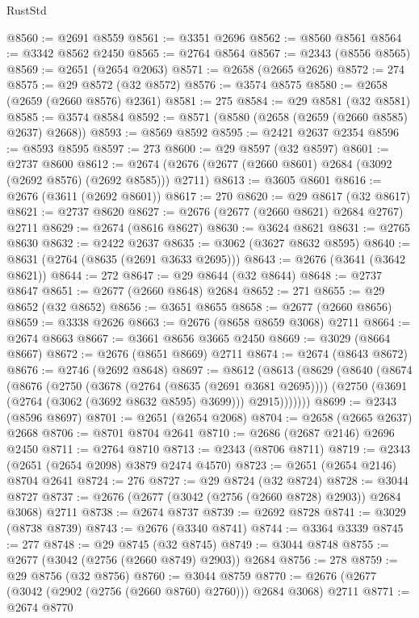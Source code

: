\begin{lexlean}{RustStd}
\begin{coremodule}
@8560 := @2691 @8559
@8561 := @3351 @2696
@8562 := @8560 @8561
@8564 := @3342 @8562 @2450
@8565 := @2764 @8564
@8567 := @2343 (@8556 @8565)
@8569 := @2651 (@2654 @2063)
@8571 := @2658 (@2665 @2626)
@8572 := 274
@8575 := @29 @8572 (@32 @8572)
@8576 := @3574 @8575
@8580 := @2658 (@2659 (@2660 @8576) @2361)
@8581 := 275
@8584 := @29 @8581 (@32 @8581)
@8585 := @3574 @8584
@8592 := @8571 (@8580 (@2658 (@2659 (@2660 @8585) @2637) @2668))
@8593 := @8569 @8592
@8595 := @2421 @2637 @2354
@8596 := @8593 @8595
@8597 := 273
@8600 := @29 @8597 (@32 @8597)
@8601 := @2737 @8600
@8612 := @2674 (@2676 (@2677 (@2660 @8601) @2684 (@3092 (@2692 @8576) (@2692 @8585))) @2711)
@8613 := @3605 @8601
@8616 := @2676 (@3611 (@2692 @8601))
@8617 := 270
@8620 := @29 @8617 (@32 @8617)
@8621 := @2737 @8620
@8627 := @2676 (@2677 (@2660 @8621) @2684 @2767) @2711
@8629 := @2674 (@8616 @8627)
@8630 := @3624 @8621
@8631 := @2765 @8630
@8632 := @2422 @2637
@8635 := @3062 (@3627 @8632 @8595)
@8640 := @8631 (@2764 (@8635 (@2691 @3633 @2695)))
@8643 := @2676 (@3641 (@3642 @8621))
@8644 := 272
@8647 := @29 @8644 (@32 @8644)
@8648 := @2737 @8647
@8651 := @2677 (@2660 @8648) @2684
@8652 := 271
@8655 := @29 @8652 (@32 @8652)
@8656 := @3651 @8655
@8658 := @2677 (@2660 @8656)
@8659 := @3338 @2626
@8663 := @2676 (@8658 @8659 @3068) @2711
@8664 := @2674 @8663
@8667 := @3661 @8656 @3665 @2450
@8669 := @3029 (@8664 @8667)
@8672 := @2676 (@8651 @8669) @2711
@8674 := @2674 (@8643 @8672)
@8676 := @2746 (@2692 @8648)
@8697 := @8612
    (@8613
      (@8629
        (@8640
          (@8674
            (@8676
              (@2750
                (@3678 (@2764 (@8635 (@2691 @3681 @2695))))
                (@2750 (@3691 (@2764 (@3062 (@3692 @8632 @8595) @3699))) @2915)))))))
@8699 := @2343 (@8596 @8697)
@8701 := @2651 (@2654 @2068)
@8704 := @2658 (@2665 @2637) @2668
@8706 := @8701 @8704 @2641
@8710 := @2686 (@2687 @2146) @2696 @2450
@8711 := @2764 @8710
@8713 := @2343 (@8706 @8711)
@8719 := @2343 (@2651 (@2654 @2098) @3879 @2474 @4570)
@8723 := @2651 (@2654 @2146) @8704 @2641
@8724 := 276
@8727 := @29 @8724 (@32 @8724)
@8728 := @3044 @8727
@8737 := @2676 (@2677 (@3042 (@2756 (@2660 @8728) @2903)) @2684 @3068) @2711
@8738 := @2674 @8737
@8739 := @2692 @8728
@8741 := @3029 (@8738 @8739)
@8743 := @2676 (@3340 @8741)
@8744 := @3364 @3339
@8745 := 277
@8748 := @29 @8745 (@32 @8745)
@8749 := @3044 @8748
@8755 := @2677 (@3042 (@2756 (@2660 @8749) @2903)) @2684
@8756 := 278
@8759 := @29 @8756 (@32 @8756)
@8760 := @3044 @8759
@8770 := @2676 (@2677 (@3042 (@2902 (@2756 (@2660 @8760) @2760))) @2684 @3068) @2711
@8771 := @2674 @8770

\end{coremodule}
\end{lexlean}
